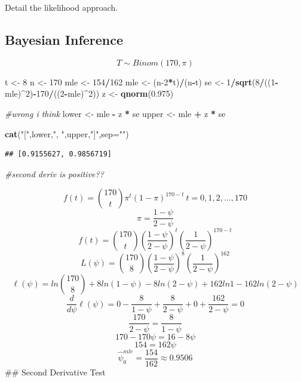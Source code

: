 \documentclass[
  11pt,
]{article}
\newenvironment{Shaded}{\begin{snugshade}}{\end{snugshade}}
\newcommand{\AttributeTok}[1]{\textcolor[rgb]{0.13,0.29,0.53}{#1}}
\newcommand{\CommentTok}[1]{\textcolor[rgb]{0.56,0.35,0.01}{\textit{#1}}}
\newcommand{\DecValTok}[1]{\textcolor[rgb]{0.00,0.00,0.81}{#1}}
\newcommand{\FloatTok}[1]{\textcolor[rgb]{0.00,0.00,0.81}{#1}}
\newcommand{\FunctionTok}[1]{\textcolor[rgb]{0.13,0.29,0.53}{\textbf{#1}}}
\newcommand{\NormalTok}[1]{#1}
\newcommand{\OtherTok}[1]{\textcolor[rgb]{0.56,0.35,0.01}{#1}}
\newcommand{\SpecialCharTok}[1]{\textcolor[rgb]{0.81,0.36,0.00}{\textbf{#1}}}
\newcommand{\StringTok}[1]{\textcolor[rgb]{0.31,0.60,0.02}{#1}}
\begin{document}
Detail the likelihood approach.

\subsection{Bayesian Inference}\label{bayesian-inference}

\[T\sim Binom(170, \pi)\]

\begin{Shaded}
\begin{Highlighting}[]
\NormalTok{t }\OtherTok{\textless{}{-}} \DecValTok{8}
\NormalTok{n }\OtherTok{\textless{}{-}} \DecValTok{170}
\NormalTok{mle }\OtherTok{\textless{}{-}} \DecValTok{154}\SpecialCharTok{/}\DecValTok{162}
\NormalTok{mle }\OtherTok{\textless{}{-}}\NormalTok{ (n}\DecValTok{{-}2}\SpecialCharTok{*}\NormalTok{t)}\SpecialCharTok{/}\NormalTok{(n}\SpecialCharTok{{-}}\NormalTok{t)}
\NormalTok{se }\OtherTok{\textless{}{-}} \DecValTok{1}\SpecialCharTok{/}\FunctionTok{sqrt}\NormalTok{(}\DecValTok{8}\SpecialCharTok{/}\NormalTok{((}\DecValTok{1}\SpecialCharTok{{-}}\NormalTok{mle)}\SpecialCharTok{\^{}}\DecValTok{2}\NormalTok{)}\SpecialCharTok{{-}}\DecValTok{170}\SpecialCharTok{/}\NormalTok{((}\DecValTok{2}\SpecialCharTok{{-}}\NormalTok{mle)}\SpecialCharTok{\^{}}\DecValTok{2}\NormalTok{))}
\NormalTok{z }\OtherTok{\textless{}{-}} \FunctionTok{qnorm}\NormalTok{(}\FloatTok{0.975}\NormalTok{)}

\CommentTok{\#wrong i think}
\NormalTok{lower }\OtherTok{\textless{}{-}}\NormalTok{ mle }\SpecialCharTok{{-}}\NormalTok{ z }\SpecialCharTok{*}\NormalTok{ se}
\NormalTok{upper }\OtherTok{\textless{}{-}}\NormalTok{ mle }\SpecialCharTok{+}\NormalTok{ z }\SpecialCharTok{*}\NormalTok{ se}

\FunctionTok{cat}\NormalTok{(}\StringTok{"["}\NormalTok{,lower,}\StringTok{", "}\NormalTok{,upper,}\StringTok{"]"}\NormalTok{,}\AttributeTok{sep=}\StringTok{""}\NormalTok{)}
\end{Highlighting}
\end{Shaded}

\begin{verbatim}
## [0.9155627, 0.9856719]
\end{verbatim}

\begin{Shaded}
\begin{Highlighting}[]
\CommentTok{\#second deriv is positive??}
\end{Highlighting}
\end{Shaded}

\[f(t)={170 \choose t}\pi^t(1-\pi)^{170-t} \ t=0,1,2,...,170\]
\[\pi=\frac{1-\psi}{2-\psi}\]
\[f(t)={170 \choose t}(\frac{1-\psi}{2-\psi})^{t}(\frac{1}{2-\psi})^{170-t}\]
\[L(\psi)={170 \choose 8}(\frac{1-\psi}{2-\psi})^8(\frac{1}{2-\psi})^{162}\]
\[\ell(\psi)=ln{170 \choose 8}+8ln(1-\psi)-8ln(2-\psi)+162ln1-162ln(2-\psi)\]
\[\frac{d}{d\psi}\ell(\psi)=0-\frac{8}{1-\psi}+\frac{8}{2-\psi}+0+\frac{162}{2-\psi}=0\]
\[\frac{170}{2-\psi}=\frac{8}{1-\psi}\] \[170-170\psi=16-8\psi\]
\[154=162\psi\] \[\widehat{\psi}_0^{mle}=\frac{154}{162}\approx 0.9506\]
\#\# Second Derivative Test
\end{document}

